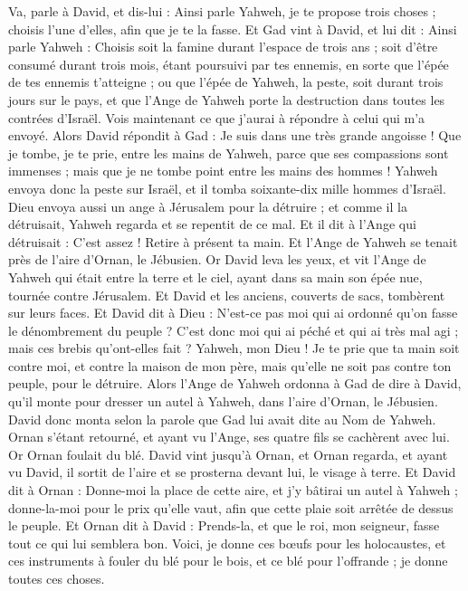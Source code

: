 \begin{multicols}{2}
Va, parle à David, et dis-lui : Ainsi parle Yahweh, je te propose trois choses ; choisis l'une d'elles, afin que je te la fasse.
Et Gad vint à David, et lui dit : Ainsi parle Yahweh :
Choisis soit la famine durant l'espace de trois ans ; soit d'être consumé durant trois mois, étant poursuivi par tes ennemis, en sorte que l'épée de tes ennemis t'atteigne ; ou que l'épée de Yahweh, la peste, soit durant trois jours sur le pays, et que l'Ange de Yahweh porte la destruction dans toutes les contrées d'Israël. Vois maintenant ce que j'aurai à répondre à celui qui m'a envoyé.
Alors David répondit à Gad : Je suis dans une très grande angoisse ! Que je tombe, je te prie, entre les mains de Yahweh, parce que ses compassions sont immenses ; mais que je ne tombe point entre les mains des hommes !
Yahweh envoya donc la peste sur Israël, et il tomba soixante-dix mille hommes d'Israël.
Dieu envoya aussi un ange à Jérusalem pour la détruire ; et comme il la détruisait, Yahweh regarda et se repentit de ce mal. Et il dit à l'Ange qui détruisait : C'est assez ! Retire à présent ta main. Et l'Ange de Yahweh se tenait près de l'aire d'Ornan, le Jébusien.
Or David leva les yeux,  et vit l'Ange de Yahweh qui était entre la terre et le ciel, ayant dans sa main son épée nue, tournée contre Jérusalem. Et David et les anciens, couverts de sacs, tombèrent sur leurs faces.
Et David dit à Dieu : N'est-ce pas moi qui ai ordonné qu'on fasse le dénombrement du peuple ? C'est donc moi qui ai péché et qui ai très mal agi ; mais ces brebis qu'ont-elles fait ? Yahweh, mon Dieu ! Je te prie que ta main soit contre moi, et contre la maison de mon père, mais qu'elle ne soit pas contre ton peuple, pour le détruire.
Alors l'Ange de Yahweh ordonna à Gad de dire à David, qu'il monte pour dresser un autel à Yahweh, dans l'aire d'Ornan, le Jébusien.
David donc monta selon la parole que Gad lui avait dite au Nom de Yahweh.
Ornan s'étant retourné, et ayant vu l'Ange,  ses quatre fils se cachèrent avec lui. Or Ornan foulait du blé.
David vint jusqu'à Ornan, et Ornan regarda, et ayant vu David, il sortit de l'aire et se prosterna devant lui, le visage à terre.
Et David dit à Ornan : Donne-moi la place de cette aire, et j'y bâtirai un autel à Yahweh ; donne-la-moi pour le prix qu'elle vaut, afin que cette plaie soit arrêtée de dessus le peuple.
Et Ornan dit à David : Prends-la, et que le roi, mon seigneur, fasse tout ce qui lui semblera bon. Voici, je donne ces bœufs pour les holocaustes, et ces instruments à fouler du blé pour le bois, et ce blé pour l'offrande ; je donne toutes ces choses.

\end{multicols}
